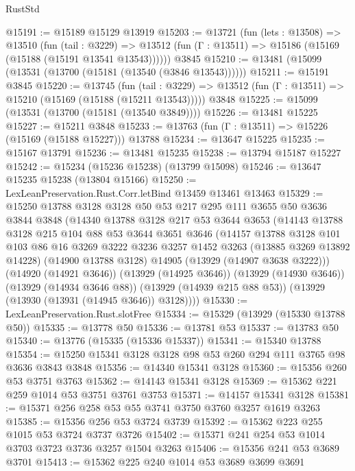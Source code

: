 \begin{lexlean}{RustStd}
\begin{coremodule}
{\begin{coremodule}
{{{{{{{{{{{{{{{{{{{{{{{{{{{{{{{{{{{{{@15191 := @15189 @15129 @13919
@15203 := @13721
    (fun (lets : @13508) =>
    @13510
      (fun (tail : @3229) =>
      @13512 (fun (Γ : @13511) => @15186 (@15169 (@15188 (@15191 @13541 @13543))))))
    @3845
@15210 := @13481 (@15099 (@13531 (@13700 (@15181 (@13540 (@3846 @13543))))))
@15211 := @15191 @3845
@15220 := @13745
    (fun (tail : @3229) => @13512 (fun (Γ : @13511) => @15210 (@15169 (@15188 (@15211 @13543)))))
    @3848
@15225 := @15099 (@13531 (@13700 (@15181 (@13540 @3849))))
@15226 := @13481 @15225
@15227 := @15211 @3848
@15233 := @13763 (fun (Γ : @13511) => @15226 (@15169 (@15188 @15227))) @13788
@15234 := @13647 @15225
@15235 := @15167 @13791
@15236 := @13481 @15235
@15238 := @13794 @15187 @15227
@15242 := @15234 (@15236 @15238) (@13799 @15098)
@15246 := @13647 @15235 @15238 (@13804 @15166)
@15250 := LexLeanPreservation.Rust.Corr.letBind @13459 @13461 @13463
@15329 := @15250
    @13788
    @3128
    @3128
    @50
    @53
    @217
    @295
    @111
    @3655
    @50
    @3636
    @3844
    @3848
    (@14340
      @13788
      @3128
      @217
      @53
      @3644
      @3653
      (@14143
        @13788
        @3128
        @215
        @104
        @88
        @53
        @3644
        @3651
        @3646
        (@14157
          @13788
          @3128
          @101
          @103
          @86
          @16
          @3269
          @3222
          @3236
          @3257
          @1452
          @3263
          (@13885 @3269 @13892 @14228)
          (@14900 @13788 @3128)
          @14905
          (@13929 (@14907 @3638 @3222)))
        (@14920 (@14921 @3646))
        (@13929 (@14925 @3646))
        (@13929 (@14930 @3646))
        (@13929 (@14934 @3646 @88))
        (@13929 (@14939 @215 @88 @53))
        (@13929 (@13930 (@13931 (@14945 @3646)) @3128))))
@15330 := LexLeanPreservation.Rust.slotFree
@15334 := @15329 (@13929 (@15330 @13788 @50))
@15335 := @13778 @50
@15336 := @13781 @53
@15337 := @13783 @50
@15340 := @13776 (@15335 (@15336 @15337))
@15341 := @15340 @13788
@15354 := @15250 @15341 @3128 @3128 @98 @53 @260 @294 @111 @3765 @98 @3636 @3843 @3848
@15356 := @14340 @15341 @3128
@15360 := @15356 @260 @53 @3751 @3763
@15362 := @14143 @15341 @3128
@15369 := @15362 @221 @259 @1014 @53 @3751 @3761 @3753
@15371 := @14157 @15341 @3128
@15381 := @15371 @256 @258 @53 @55 @3741 @3750 @3760 @3257 @1619 @3263
@15385 := @15356 @256 @53 @3724 @3739
@15392 := @15362 @223 @255 @1015 @53 @3724 @3737 @3726
@15402 := @15371 @241 @254 @53 @1014 @3703 @3723 @3736 @3257 @1504 @3263
@15406 := @15356 @241 @53 @3689 @3701
@15413 := @15362 @225 @240 @1014 @53 @3689 @3699 @3691
}}}}}}}}}}}}}}}}}}}}}}}}}}}}}}}}}}}}}
\end{coremodule}}
\end{coremodule}
\end{lexlean}
